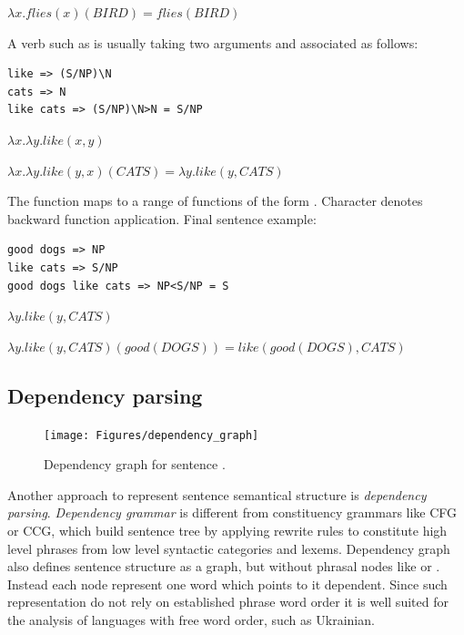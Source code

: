 $\lambda x.flies(x)(BIRD)=flies(BIRD) $

A verb such as  is usually taking two arguments and associated as follows:

\begin{verbatim}
like => (S/NP)\N
cats => N
like cats => (S/NP)\N>N = S/NP
\end{verbatim}

$\lambda x.\lambda y.like(x, y)$

$\lambda x.\lambda y.like(y, x)(CATS)=\lambda y.like(y, CATS)$

The function  maps  to a range of functions of the form .  Character \code{<} denotes backward function application. Final sentence example:

\begin{verbatim}
good dogs => NP
like cats => S/NP
good dogs like cats => NP<S/NP = S
\end{verbatim}

$\lambda y.like(y, CATS)$

$\lambda y.like(y, CATS)(good(DOGS))=like(good(DOGS), CATS)$

\subsection{Dependency parsing}

\begin{figure}[h]
\centering
\texttt{[image: Figures/dependency\_graph]}
\decoRule
\caption[Dependency graph]{Dependency graph for sentence \protect\footnotemark.}
\label{fig:dependency_graph}
\end{figure}


Another approach to represent sentence semantical structure is \emph{dependency parsing}. \emph{Dependency grammar} is different from constituency grammars like CFG or CCG, which build sentence tree by applying rewrite rules to constitute high level phrases from low level syntactic categories and lexems. Dependency graph also defines sentence structure as a graph, but without phrasal nodes like  or . Instead each node represent one word which points to it dependent. Since such representation do not rely on established phrase word order it is well suited for the analysis of languages with free word order, such as Ukrainian.

